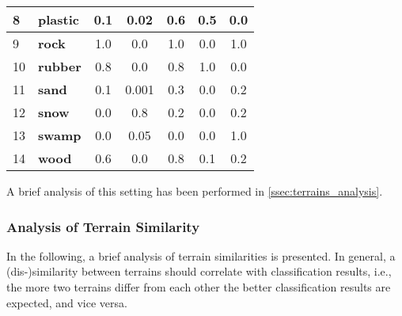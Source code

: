 \begin{table}[H]
\begin{tabular}{|l|l|c|c|c|c|c|}
8                         & \textbf{plastic}       & 0.1                                     & 0.02                                       & 0.6                                    & 0.5                                      & 0.0                                  \\ \hline
9                         & \textbf{rock}          & 1.0                                     & 0.0                                        & 1.0                                    & 0.0                                      & 1.0                                  \\ \hline
10	 					  & \textbf{rubber}        & 0.8                                     & 0.0                                        & 0.8                                    & 1.0                                      & 0.0                                  \\ \hline
11                        & \textbf{sand}          & 0.1                                     & 0.001                                      & 0.3                                    & 0.0                                      & 0.2                                  \\ \hline
12                        & \textbf{snow}          & 0.0                                     & 0.8                                        & 0.2                                    & 0.0                                      & 0.2                                  \\ \hline
13                        & \textbf{swamp}         & 0.0                                     & 0.05                                       & 0.0                                    & 0.0                                      & 1.0                                  \\ \hline
14                        & \textbf{wood}          & 0.6                                     & 0.0                                        & 0.8                                    & 0.1                                      & 0.2                                  \\ \hline
\end{tabular}
\end{table}

A brief analysis of this setting has been performed in \cref{ssec:terrains_analysis}.

\subsubsection*{Analysis of Terrain Similarity} \label{sssec:terrains_analysis}
In the following, a brief analysis of terrain similarities is presented. In general, a (dis-)similarity between terrains should correlate with classification results, i.e., the more two terrains differ from each other the better classification results are expected, and vice versa.

